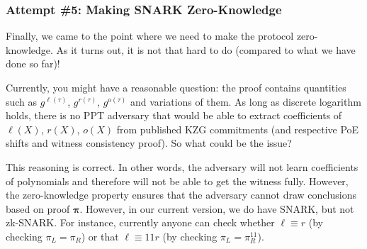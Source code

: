 \documentclass[../lecture-notes-148x210.tex]{subfiles}
\begin{document}
\subsubsection{Attempt \#5: Making SNARK Zero-Knowledge}

Finally, we came to the point where we need to make the protocol zero-knowledge. As it turns out, it is not that hard to do (compared to what we have done so far)!

\begin{remark}
    Currently, you might have a reasonable question: the proof contains quantities such as $g^{\ell(\tau)}$, $g^{r(\tau)}$, $g^{o(\tau)}$ and variations of them. As long as discrete logarithm holds, there is no PPT adversary that would be able to extract coefficients of $\ell(X)$, $r(X)$, $o(X)$ from published KZG commitments (and respective PoE shifts and witness consistency proof). So what could be the issue?

    This reasoning is correct. In other words, the adversary will not learn coefficients of polynomials and therefore will not be able to get the witness fully. However, the zero-knowledge property ensures that the adversary cannot draw conclusions based on proof $\boldsymbol{\pi}$. However, in our current version, we do have SNARK, but not zk-SNARK. For instance, currently anyone can check whether $\ell \equiv r$ (by checking $\pi_L = \pi_R$) or that $\ell \equiv 11r$ (by checking $\pi_L = \pi_R^{11}$).  
\end{remark}
\end{document}

